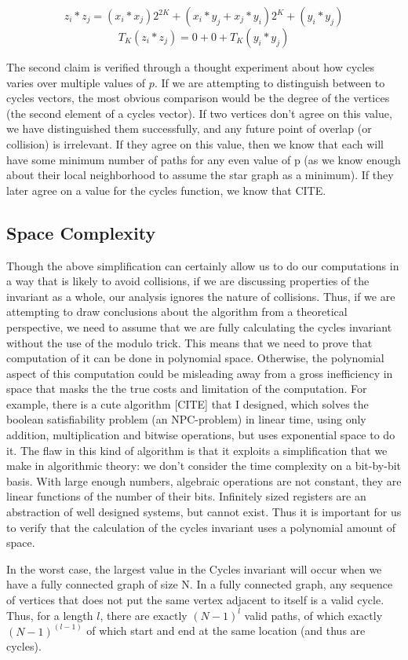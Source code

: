$$z_i * z_j = (x_i*x_j)2^{2K} + (x_i*y_j + x_j*y_i)2^K + (y_i * y_j)$$
$$T_K(z_i * z_j) = 0 + 0 + T_K(y_i * y_j)$$

The second claim is verified through a thought experiment about how cycles varies over multiple values of $p$.
If we are attempting to distinguish between to cycles vectors, the most obvious comparison would be the degree of the vertices (the second element of a cycles vector).
If two vertices don't agree on this value, we have distinguished them successfully, and any future point of overlap (or collision) is irrelevant. 
If they agree on this value, then we know that each will have some minimum number of paths for any even value of p (as we know enough about their local neighborhood to assume the star graph as a minimum). 
If they later agree on a value for the cycles function, we know that CITE.


\subsection{Space Complexity}
Though the above simplification can certainly allow us to do our computations in a way that is likely to avoid collisions, if we are discussing properties of the invariant as a whole, our analysis ignores the nature of collisions.
Thus, if we are attempting to draw conclusions about the algorithm from a theoretical perspective, we need to assume that we are fully calculating the cycles invariant without the use of the modulo trick.
This means that we need to prove that computation of it can be done in polynomial space.
Otherwise, the polynomial aspect of this computation could be misleading away from a gross inefficiency in space that masks the the true costs and limitation of the computation.
For example, there is a cute algorithm [CITE] that I designed, which solves the boolean satisfiability problem (an NPC-problem) in linear time, using only addition, multiplication and bitwise operations, but uses exponential space to do it. 
The flaw in this kind of algorithm is that it exploits a simplification that we make in algorithmic theory: we don't consider the time complexity on a bit-by-bit basis.
With large enough numbers, algebraic operations are not constant, they are linear functions of the number of their bits.
Infinitely sized registers are an abstraction of well designed systems, but cannot exist.
Thus it is important for us to verify that the calculation of the cycles invariant uses a polynomial amount of space.

In the worst case, the largest value in the Cycles invariant will occur when we have a fully connected graph of size N.
In a fully connected graph, any sequence of vertices that does not put the same vertex adjacent to itself is a valid cycle.
Thus, for a length $l$, there are exactly $(N-1)^l$ valid paths, of which exactly $(N-1)^{(l-1)}$ of which start and end at the same location (and thus are cycles).

